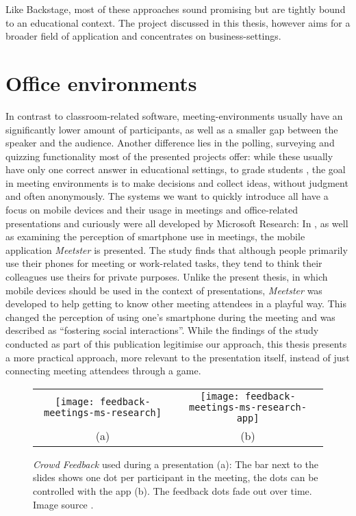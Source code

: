 Like Backstage, most of these approaches sound promising but are tightly bound to an educational context. The project discussed in this thesis, however aims for a broader field of application and concentrates on business-settings.

\section{Office environments}
\label{sec:related-work-office}

In contrast to classroom-related software, meeting-en\-vi\-ron\-ments usually have an significantly lower amount of participants, as well as a smaller gap between the speaker and the audience. Another difference lies in the polling, surveying and quizzing functionality most of the presented projects offer: while these usually have only one correct answer in educational settings, to grade students \cite{Lindquist:ExploringMobilePhonesActiveLearning, Triglianos:InteractiveWebPresentationsImpress, Bry:Backstage}, the goal in meeting environments is to make decisions and collect ideas, without judgment and often anonymously.
The systems we want to quickly introduce all have a focus on mobile devices and their usage in meetings and office-related presentations and curiously were all developed by Microsoft Research: In \cite{Bohmer:SmartphoneUseRude}, as well as examining the perception of smartphone use in meetings, the mobile application \emph{Meetster} is presented. The study finds that although people primarily use their phones for meeting or work-related tasks, they tend to think their colleagues use theirs for private purposes. Unlike the present thesis, in which mobile devices should be used in the context of presentations, \emph{Meetster} was developed to help getting to know other meeting attendees in a playful way. This changed the perception of using one's smartphone during the meeting and was described as ``fostering social interactions''. While the findings of the study conducted as part of this publication legitimise our approach, this thesis presents a more practical approach, more relevant to the presentation itself, instead of just connecting meeting attendees through a game.

\begin{figure}
\centering\small
\begin{tabular}{cc}
\texttt{[image: feedback-meetings-ms-research]}
 &
\texttt{[image: feedback-meetings-ms-research-app]} \\
(a) & (b)
\end{tabular}
\caption{\emph{Crowd Feedback} \cite{Teevan:MobileFeedbackDuringPresentation} used during a presentation (a): The bar next to the slides shows one dot per participant in the meeting, the dots can be controlled with the app (b). The feedback dots fade out over time. Image source \cite{Teevan:MobileFeedbackDuringPresentation}.}
\label{fig:related-work-crowd-feedback}
\end{figure}

